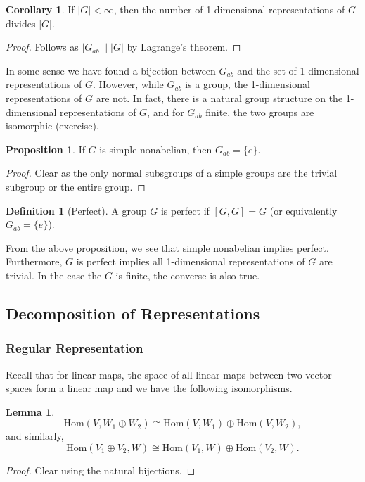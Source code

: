 \documentclass[]{article}
\theoremstyle{definition}
\newtheorem{corollary}{Corollary}[theorem]
\theoremstyle{definition}
\newtheorem{definition}{Definition}[section]
\newtheorem{lemma}{Lemma}[section]
\newtheorem{proposition}{Proposition}[section]
\begin{document}
\begin{corollary}
  If \(|G| < \infty\), then the number of 1-dimensional representations of \(G\) 
  divides \(|G|\).
\end{corollary}
\begin{proof}
  Follows as \(|G_{ab}| \mid |G|\) by Lagrange's theorem.
\end{proof}

In some sense we have found a bijection between \(G_{ab}\) and the set 
of 1-dimensional representations of \(G\). However, while \(G_{ab}\) is a group,
the 1-dimensional representations of \(G\) are not. In fact, there is a natural 
group structure on the 1-dimensional representations of \(G\), and for 
\(G_{ab}\) finite, the two groups are isomorphic (exercise).

\begin{proposition}
  If \(G\) is simple nonabelian, then \(G_{ab} = \{e\}\).
\end{proposition}
\begin{proof}
  Clear as the only normal subsgroups of a simple groups are the trivial subgroup 
  or the entire group.
\end{proof}

\begin{definition}[Perfect]
  A group \(G\) is perfect if \([G, G] = G\) (or equivalently \(G_{ab} = \{e\}\)).
\end{definition}

From the above proposition, we see that simple nonabelian implies perfect. 
Furthermore, \(G\) is perfect implies all 1-dimensional representations of \(G\) 
are trivial. In the case the \(G\) is finite, the converse is also true.

\subsection{Decomposition of Representations}

\subsubsection{Regular Representation}

Recall that for linear maps, the space of all linear maps between two vector 
spaces form a linear map and we have the following isomorphisms.

\begin{lemma}
  \[\text{Hom}(V, W_1 \oplus W_2) \cong \text{Hom}(V, W_1) \oplus \text{Hom}(V, W_2),\]
  and similarly,
  \[\text{Hom}(V_1 \oplus V_2, W) \cong \text{Hom}(V_1, W) \oplus \text{Hom}(V_2, W).\]
\end{lemma}
\begin{proof}
  Clear using the natural bijections.
\end{proof}
\end{document}
